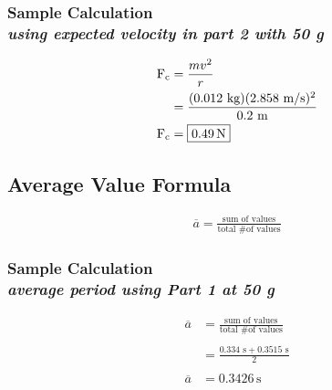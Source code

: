 \subsubsection{Sample Calculation \\ {\normalfont \small\textit{using expected velocity in part 2 with 50 g}}}

{\centering
\begin{align*}
	\text{F\textsubscript{c}}  &= \frac{mv^2}{r} \\
			&= \frac{(0.012\text{ kg})(2.858\text{ m/s})^2}{0.2\text{ m}} \\
	\text{F\textsubscript{c}}  &= \boxed{0.49\,\text{N}}
\end{align*}}


\subsection{Average Value Formula} 

\begin{align*}
	\overline{a} = \frac{\text{sum of values}}{\text{total \# of values}} 
\end{align*}

\subsubsection{Sample Calculation \\ {\normalfont \small\textit{average period using Part 1 at 50 g}}}

\begin{align*}
	\overline{a}&=\frac{\text{sum of values}}{\text{total \# of values}} \\ \\
							&= \frac{0.334\text{ s}+0.3515\text{ s}}{2} \\ \\
	\overline{a}&= \boxed{0.3426\,\text{s}}
\end{align*}

